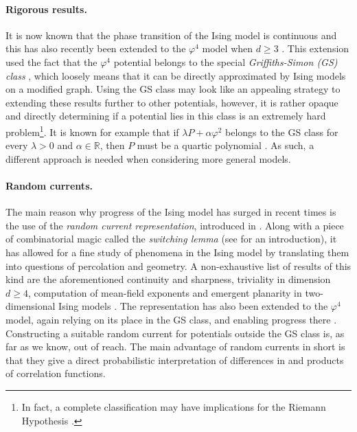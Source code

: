 \documentclass{article}
\numberwithin{equation}{section}
\theoremstyle{definition}
\theoremstyle{definition}
\theoremstyle{remark}
\newcommand\vp{\varphi}
\newcommand\R{\mathbb{R}}
\begin{document}
\paragraph{Rigorous results. }It is now known that the phase transition of the Ising model is continuous \cites{Yan52,AF,ADCS} and this has also recently been extended to the $\vp^4$ model when $d \geq 3$ \cites{GPPS}. This extension used the fact that the $\vp^4$ potential belongs to the special \emph{Griffiths-Simon (GS) class} \cite{simon1973varphi4}, which loosely means that it can be directly approximated by Ising models on a modified graph. Using the GS class may look like an appealing strategy to extending these results further to other potentials, however, it is rather opaque and directly determining if a potential lies in this class is an extremely hard problem{\hypersetup{linkcolor=black}\footnote{In fact, a complete classification may have implications for the Riemann Hypothesis \cite[Section 4]{newman}.}}. It is known for example that if $\lambda P + \alpha \vp^2$ belongs to the GS class for every $\lambda > 0$ and $\alpha \in \R$, then $P$ must be a quartic polynomial \cite{newman1976rigorous}. As such, a different approach is needed when considering more general models.

\paragraph{Random currents. }The main reason why progress of the Ising model has surged in recent times is the use of the \emph{random current representation}, introduced in \cites{GHS,Aiz82}. Along with a piece of combinatorial magic called the \emph{switching lemma} (see \cite{duminil2018random} for an introduction), it has allowed for a fine study of phenomena in the Ising model by translating them into questions of percolation and geometry. A non-exhaustive list of results of this kind are the aforementioned continuity and sharpness, triviality in dimension $d \geq 4$, computation of mean-field exponents and emergent planarity in two-dimensional Ising models \cites{AF,ADCS,ABF,DCT,Aiz82,ADC,DCP-2-point,vEGPS,ADTW}. The representation has also been extended to the $\vp^4$ model, again relying on its place in the GS class, and enabling progress there \cite{GPPS}. Constructing a suitable random current for potentials outside the GS class is, as far as we know, out of reach. The main advantage of random currents in short is that they give a direct probabilistic interpretation of differences in and products of correlation functions. 
\end{document}
